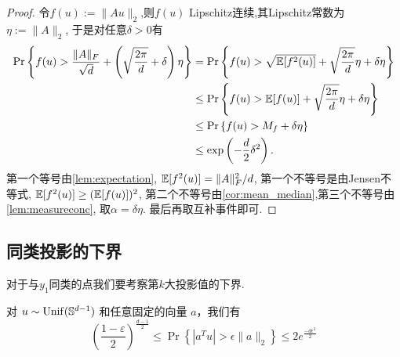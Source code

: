 \begin{proof}
  令\(f(u):=\|Au\|_2\),则\(f(u)\) Lipschitz连续,其Lipschitz常数为\(\eta:=\|A\|_2\),
  于是对任意\(\delta>0\)有
  \begin{align*}
    \Pr \left\{ f(u) > \frac{\|A\|_F}{\sqrt{d}} + 
    \left (\sqrt{\frac{2\pi}{d}}+\delta\right)\eta\right\} &=
    \Pr \left\{ f(u) > \sqrt{\mathbb{E}[f^2(u)]}+
    \sqrt{\frac{2\pi}{d}}\eta+\delta\eta\right\} \\
    &\le \Pr \left\{ f(u) > \mathbb{E}[f(u)] +
    \sqrt{\frac{2\pi}{d}}\eta+\delta\eta\right\} \\
    &\le \Pr \left\{ f(u) > M_f+\delta\eta \right\}\\
    &\le \exp\left( -\frac{d}{2}\delta^2 \right).
  \end{align*}
  第一个等号由\autoref{lem:expectation}, \(\mathbb{E}[f^2(u)]= \|A\|_F^2/d\),
  第一个不等号是由Jensen不等式, \(\mathbb{E}[f^2(u)]\ge (\mathbb{E}[f(u)])^2\),
  第二个不等号由\autoref{cor:mean_median},第三个不等号由\autoref{lem:measureconc},
  取\(\alpha=\delta\eta\). 最后再取互补事件即可.
\end{proof}

\subsection{同类投影的下界}
对于与\(y_1\)同类的点我们要考察第\(k\)大投影值的下界.
\begin{lemma}\label{lem:spherical_cap}
  对 \(u \sim \operatorname{Unif}(\mathbb{S}^{d-1})\) 和任意固定的向量 \(a\)，我们有
  \begin{equation*}
    \left( \frac{1-\varepsilon}{2} \right)^{\frac{d-1}{2}} \le
    \Pr\left\{|a^Tu|>\epsilon \|a\|_2\right\} \le 2e^{\frac{-d\epsilon^2}{2}}
  \end{equation*}
\end{lemma}

